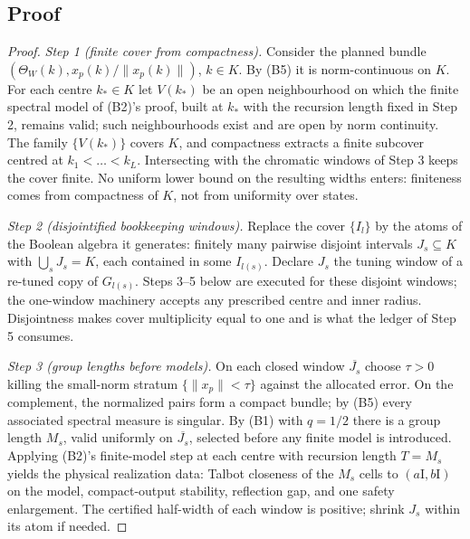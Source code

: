\documentclass[11pt]{article}
\theoremstyle{remark}
\theoremstyle{definition}
\newcommand{\Id}{\mathrm I}
\begin{document}
\subsection{Proof}

\begin{proof}
\emph{Step 1 (finite cover from compactness).}
Consider the planned bundle $(\Theta_W(k),x_p(k)/\|x_p(k)\|)$, $k\in K$.  By
(B5) it is norm-continuous on $K$.  For each centre $k_\ast\in K$ let $V(k_\ast)$
be an open neighbourhood on which the finite spectral model of (B2)'s proof,
built at $k_\ast$ with the recursion length fixed in Step 2, remains valid;
such neighbourhoods exist and are open by norm continuity.  The family
$\{V(k_\ast)\}$ covers $K$, and compactness extracts a finite subcover centred
at $k_1<\dots<k_L$.  Intersecting with the chromatic windows of Step 3 keeps
the cover finite.  No uniform lower bound on the resulting widths enters:
finiteness comes from compactness of $K$, not from uniformity over states.

\emph{Step 2 (disjointified bookkeeping windows).}
Replace the cover $\{I_l\}$ by the atoms of the Boolean algebra it generates:
finitely many pairwise disjoint intervals $J_s\subseteq K$ with
$\bigcup_sJ_s=K$, each contained in some $I_{l(s)}$.  Declare $J_s$ the tuning
window of a re-tuned copy of $G_{l(s)}$.  Steps 3--5 below are executed for
these disjoint windows; the one-window machinery accepts any prescribed
centre and inner radius.  Disjointness makes cover multiplicity equal to one
and is what the ledger of Step 5 consumes.

\emph{Step 3 (group lengths before models).}
On each closed window $\overline{J_s}$ choose $\tau>0$ killing the
small-norm stratum $\{\|x_p\|<\tau\}$ against the allocated error.  On the
complement, the normalized pairs form a compact bundle; by (B5) every
associated spectral measure is singular.  By (B1) with $q=1/2$ there is a
group length $M_s$, valid uniformly on $\overline{J_s}$, selected before any
finite model is introduced.  Applying (B2)'s finite-model step at each centre
with recursion length $T=M_s$ yields the physical realization data: Talbot
closeness of the $M_s$ cells to $(a\Id,b\Id)$ on the model, compact-output
stability, reflection gap, and one safety enlargement.  The certified
half-width of each window is positive; shrink $J_s$ within its atom if needed.


\end{proof}
\end{document}
